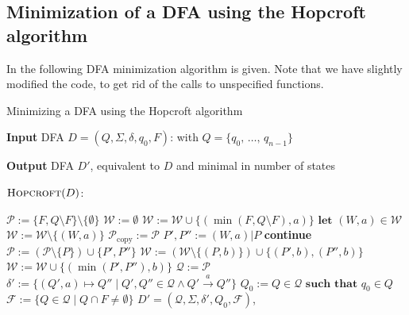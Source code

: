 \documentclass[11pt]{article}
\newcommand{\set}[1]{\ensuremath{\{ #1 \} }} %
\begin{document}
\clearpage
\subsection{Minimization of a DFA using the Hopcroft algorithm}
In \cite{DBLP:journals/corr/abs-1010-5318} the following DFA minimization algorithm is given. Note that we have slightly modified the code, to get rid of the calls to unspecified functions.

\begin{algorithm}
\small
\caption{Minimizing a DFA using the Hopcroft algorithm}
\vspace*{1.0ex}
\textbf{Input}
DFA $D = (Q, \Sigma, \delta, q_0, F)$: 
with $Q = \lbrace q_0 ,\, \ldots ,\, q_{n{-}1} \rbrace$

\textbf{Output} 
DFA $D'$, equivalent to $D$ and minimal in number of states

\vspace{2.0ex}

$\textsc{Hopcroft}(D)$:
\begin{algorithmic}[1]
\State $\mathcal{P} := \set{F, Q \setminus F } \setminus \set{\emptyset}$ 
\State $\mathcal{W} := \emptyset$ 
  \State $\mathcal{W} := \mathcal{W} \cup \set{(\min(F, Q \setminus F), a)}$
\EndFor
{}
  \State $\textbf{let } (W,a) \in \mathcal{W}$ 
  \State $\mathcal{W} := \mathcal{W} \setminus \set{(W,a)}$
  \State $\mathcal{P}_\text{copy} := \mathcal{P}$
    \State $P', P'' := (W,a) | P$ 
      \State \textbf{continue}
    \EndIf
    \State $\mathcal{P} := (\mathcal{P} \setminus \set{P}) \cup \set{P', P''}$
     
        \State $\mathcal{W} := (\mathcal{W} \setminus \set{(P,b)}) \cup \set{(P',b), (P'',b)}$
      \Else
        \State $\mathcal{W} := \mathcal{W} \cup \set{(\min(P',P''), b)}$
      \EndIf
    \EndFor
  \EndFor
\EndWhile
\State $\mathcal{Q} := \mathcal{P}$ 
\State $\delta' := \set{(Q', a) \mapsto Q'' \mid Q', Q'' \in \mathcal{Q} \land Q' \xrightarrow{a} Q''}$
\State $Q_0 := Q \in \mathcal{Q} \textbf{ such that } q_0 \in Q$
\State $\mathcal{F} := \set{Q \in \mathcal{Q} \mid Q \cap F \neq \emptyset}$
\State \Return $D' = (\mathcal{Q}, \Sigma, \delta', Q_0, \mathcal{F})$,
\vspace*{1.0ex}
\end{algorithmic}
\end{algorithm}
\end{document}
